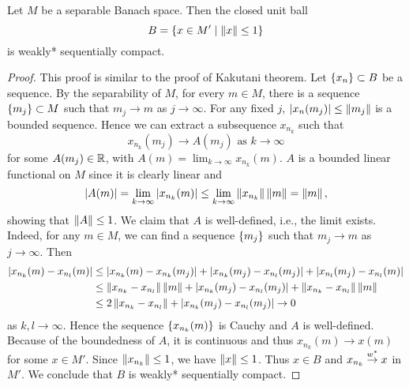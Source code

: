 \begin{theorem}
    Let $M$ be a separable Banach space. Then the closed unit ball 
    \begin{equation*}
        B = \left\{ x\in M' \;\middle\vert\; \left\lVert {x} \right\rVert\leq 1 \right\}
    \end{equation*}
    is weakly* sequentially compact.
\end{theorem}
\begin{proof}
    This proof is similar to the proof of Kakutani theorem. Let $\left\{ {x_n} \right\}\subset B$ be a 
    sequence. By the separability of $M$, for every $m\in M$, there is a sequence $\left\{ {m_j} \right\}\subset M$ 
    such that $m_j\to m$ as $j\to\infty$. For any fixed $j$, $\left\lvert {x_n(m_j)} \right\rvert\leq \left\lVert {m_j} \right\rVert$ 
    is a bounded sequence. Hence we can extract a subsequence $x_{n_k}$ such that 
    \begin{equation*}
        x_{n_k}(m_j)\to A(m_j) \text{ as } k\to\infty
    \end{equation*}
    for some $A(m_j)\in\mathbb{R}$, with $A(m) = \lim_{k\to\infty} x_{n_k}(m)$. $A$ is a 
    bounded linear functional on $M$ since it is clearly linear and 
    \begin{equation*}
        \left\lvert {A(m)} \right\rvert = \lim_{k\to\infty} \left\lvert {x_{n_k}(m)} \right\rvert \leq \lim_{k\to\infty} \left\lVert {x_{n_k}} \right\rVert\left\lVert {m} \right\rVert = \left\lVert {m} \right\rVert,
    \end{equation*}
    showing that $\left\lVert {A} \right\rVert\leq 1$. We claim that $A$ is well-defined, i.e., 
    the limit exists. Indeed, for any $m\in M$, we can find a sequence $\left\{ {m_j} \right\}$ such that 
    $m_j\to m$ as $j\to\infty$. Then 
    \begin{equation*}
        \begin{split}
            \left\lvert {x_{n_k}(m) - x_{n_l}(m)} \right\rvert &\leq \left\lvert {x_{n_k}(m) - x_{n_k}(m_j)} \right\rvert + \left\lvert {x_{n_k}(m_j) - x_{n_l}(m_j)} \right\rvert + \left\lvert {x_{n_l}(m_j) - x_{n_l}(m)} \right\rvert \\
            &\leq \left\lVert {x_{n_k}-x_{n_l}} \right\rVert\left\lVert {m} \right\rVert + \left\lvert {x_{n_k}(m_j) - x_{n_l}(m_j)} \right\rvert + \left\lVert {x_{n_k}-x_{n_l}} \right\rVert\left\lVert {m} \right\rVert \\
            &\leq 2\left\lVert {x_{n_k}-x_{n_l}} \right\rVert + \left\lvert {x_{n_k}(m_j) - x_{n_l}(m_j)} \right\rvert \to 0
        \end{split}
    \end{equation*}
    as $k,l\to\infty$. Hence the sequence $\left\{ {x_{n_k}(m)} \right\}$ is Cauchy and $A$ 
    is well-defined. Because of the boundedness of $A$, it is continuous and thus
    $x_{n_k}(m)\to x(m)$ for some $x\in M'$. Since $\left\lVert {x_{n_k}} \right\rVert\leq 1$, we have 
    $\left\lVert {x} \right\rVert\leq 1$. Thus $x\in B$ and $x_{n_k}\overset{w^*}{\to} x$ in $M'$. We conclude that 
    $B$ is weakly* sequentially compact.
\end{proof}

